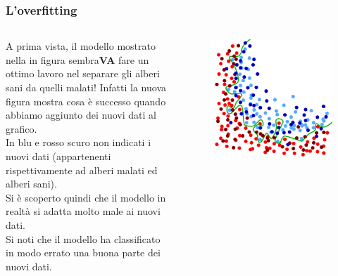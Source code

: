 \begin{frame}

	\frametitle{L'overfitting}
 
	\begin{columns}
			A prima vista, il modello mostrato nella in figura sembra\textbf{VA} fare un ottimo lavoro nel separare gli alberi sani da quelli malati!
			\newlinedouble
			Infatti la nuova figura mostra cosa è successo quando abbiamo aggiunto dei nuovi dati al grafico.\\

			In blu e rosso scuro non indicati i nuovi dati (appartenenti rispettivamente ad alberi malati ed alberi sani).\\

			Si è scoperto quindi che il modello in realtà si adatta molto male ai nuovi dati.\\
			Si noti che il modello ha classificato in modo errato una buona parte dei nuovi dati.



			\begin{figure}[!htbp]
				\centering
				\includegraphics[width=1.0\linewidth]{images/supervised/validation_test_training_peril_of_overfitting/overfitting_green_line_with_test.pdf}
			\end{figure}

	\end{columns}
\end{frame}


